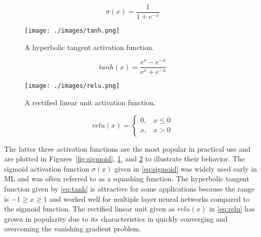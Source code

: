 \begin{equation}\label{eq:sigmoid}
    \sigma(x) = \frac{1}{1 + e^{-x}}
\end{equation}


\begin{figure}[H]
    \texttt{[image: ./images/tanh.png]}
    \caption{A hyperbolic tangent activation function.}
    \label{fig:tanh}
\end{figure}

\begin{equation}\label{eq:tanh}
    tanh(x) = \frac{e^x - e^{-x}}{e^x+e^{-x}}
\end{equation}

\begin{figure}[H]
    \texttt{[image: ./images/relu.png]}
    \caption{A rectified linear unit activation function.}
    \label{fig:relu}
\end{figure}

\begin{equation}\label{eq:relu}
    relu(x) =
    \begin{cases}
        0,& x \leq 0 \\
        x,& x > 0
    \end{cases}
\end{equation}

The latter three activation functions are the most popular in practical use and
are plotted in Figures~\ref{fig:sigmoid}, \ref{fig:tanh}, and \ref{fig:relu} to
illustrate their behavior. The sigmoid activation function $\sigma(x)$ given in
\eqref{eq:sigmoid} was widely used early in ML and was often referred to as a
squashing function.  The hyperbolic tangent function given by \eqref{eq:tanh} is
attractive for some applications because the range is $-1 \geq x \geq 1$ and
worked well for multiple layer neural networks compared to the sigmoid function.
The rectified linear unit given as $relu(x)$ in \eqref{eq:relu} has grown in
popularity due to its characteristics in quickly converging and overcoming the
vanishing gradient problem\cite{krizhevsky2012imagenet, nwankpa2018activation}.




